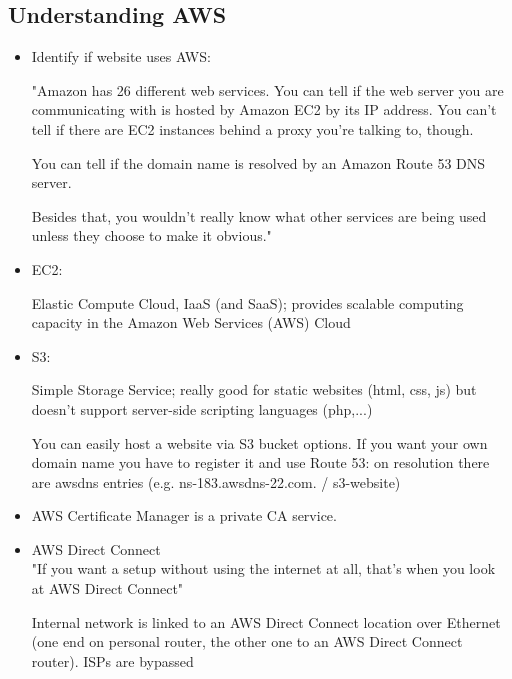 \documentclass[12pt]{article}
\begin{document}
\subsection*{Understanding AWS}
\begin{itemize}
    \item Identify if website uses AWS:
    
    "Amazon has 26 different web services. You can tell if the web server you are communicating with is hosted by Amazon EC2 by its IP address. You can't tell if there are EC2 instances behind a proxy you're talking to, though.

    You can tell if the domain name is resolved by an Amazon Route 53 DNS server.

    Besides that, you wouldn't really know what other services are being used unless they choose to make it obvious."
    
    \item EC2:
    
    Elastic Compute Cloud, IaaS (and SaaS); provides scalable computing capacity in the Amazon Web Services (AWS) Cloud
    
    \item S3:
    
    Simple Storage Service; really good for static websites (html, css, js) but doesn't support server-side scripting languages (php,...)
    
    You can easily host a website via S3 bucket options. If you want your own domain name you have to register it and use Route 53: on resolution there are awsdns entries (e.g. ns-183.awsdns-22.com. / s3-website)
    
    \item AWS Certificate Manager is a private CA service.
    
    \item AWS Direct Connect \\
    "If you want a setup without using the internet at all, that's when you look at AWS Direct Connect" 
    
    Internal network is linked to an AWS Direct Connect location over Ethernet (one end on personal router, the other one to an AWS Direct Connect router). ISPs are bypassed
    
    
    
\end{itemize}
\end{document}
